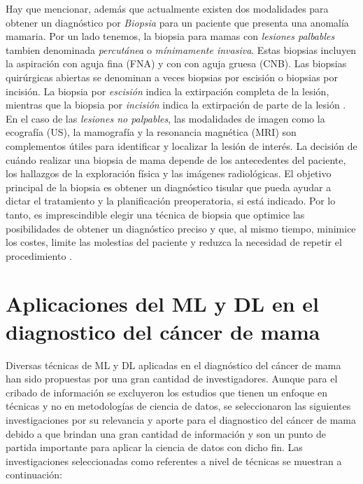 Hay que mencionar, además que actualmente existen dos modalidades para obtener un diagnóstico por \textit{Biopsia} para un paciente que presenta una anomalía mamaria. Por un lado tenemos, la biopsia para mamas con \textit{lesiones palbables} tambien denominada \textit{percutánea} o \textit{mínimamente invasiva}. Estas biopsias incluyen la aspiración con aguja fina (FNA) y con con aguja gruesa (CNB). Las biopsias quirúrgicas abiertas se denominan a veces biopsias por escisión o biopsias por incisión. La biopsia por \textit {escisión} indica la extirpación completa de la lesión, mientras que la biopsia por \textit {incisión} indica la extirpación de parte de la lesión \citep{Greenfield2012}. En el caso de las \textit{lesiones no palpables}, las modalidades de imagen como la ecografía (US), la mamografía y la resonancia magnética (MRI) son complementos útiles para identificar y localizar la lesión de interés. La decisión de cuándo realizar una biopsia de mama depende de los antecedentes del paciente, los hallazgos de la exploración física y las imágenes radiológicas. El objetivo principal de la biopsia es obtener un diagnóstico tisular que pueda ayudar a dictar el tratamiento y la planificación preoperatoria, si está indicado. Por lo tanto, es imprescindible elegir una técnica de biopsia que optimice las posibilidades de obtener un diagnóstico preciso y que, al mismo tiempo, minimice los costes, limite las molestias del paciente y reduzca la necesidad de repetir el procedimiento \citep{Samilia2018} .
	
\section{Aplicaciones del ML y DL en el diagnostico del cáncer de mama}
 Diversas técnicas de ML y DL aplicadas en el diagnóstico del cáncer de mama han sido propuestas por una gran cantidad de investigadores. Aunque para el cribado de información se excluyeron los estudios que tienen un enfoque en técnicas y no en metodologías de ciencia de datos, se seleccionaron las siguientes investigaciones por su relevancia y aporte para el diagnostico del cáncer de mama debido a que brindan una gran cantidad de información y son un punto de partida importante para aplicar la ciencia de datos con dicho fin. Las investigaciones seleccionadas como referentes a nivel de técnicas se muestran a continuación:

